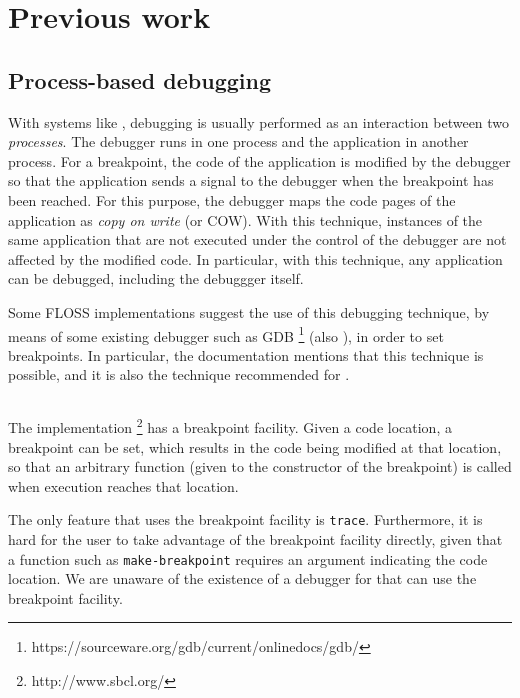 \section{Previous work}

\subsection{Process-based debugging}

With systems like \unix{}, debugging is usually performed as an
interaction between two \emph{processes}.  The debugger runs in one
process and the application in another process.  For a breakpoint, the
code of the application is modified by the debugger so that the
application sends a signal to the debugger when the breakpoint has
been reached.  For this purpose, the debugger maps the code pages of
the application as \emph{copy on write} (or COW).  With this
technique, instances of the same application that are not executed
under the control of the debugger are not affected by the modified
code.  In particular, with this technique, any application can be
debugged, including the debuggger itself.

Some FLOSS \commonlisp{} implementations suggest the use of
this debugging technique, by means of some existing debugger such as GDB%
\footnote{https://sourceware.org/gdb/current/onlinedocs/gdb/}
(also \cite{Stallman:gdb}), in order
to set breakpoints.  In particular, the \ccl{}
 documentation mentions that this technique
is possible, and it is also the technique recommended for \ecl{}
.

\subsection{\sbcl{}}

The \sbcl{} \commonlisp{} implementation%
\footnote{http://www.sbcl.org/}
has a breakpoint facility.  Given a code location, a breakpoint can be
set, which results in the code being modified at that location, so
that an arbitrary function (given to the constructor of the
breakpoint) is called when execution reaches that location.

The only feature that uses the breakpoint facility is \texttt{trace}.
Furthermore, it is hard for the user to take advantage of the
breakpoint facility directly, given that a function such as
\texttt{make-breakpoint} requires an argument indicating the code
location.  We are unaware of the existence of a debugger for \sbcl{}
that can use the breakpoint facility.

